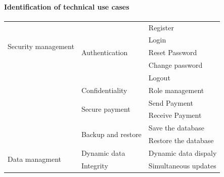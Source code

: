 \paragraph{Identification of technical use cases}

\begin{longtable}{|m{10em}|m{10em}|m{10em}|}\hline
      \multirow{4}{*}{Security management} & \multirow{5}{*}{Authentication}          & Register                                                    \\\cline{3-3}
                                           &                                          & Login                                                       \\\cline{3-3}
                                           &                                          & Reset Password                                              \\\cline{3-3}
                                           &                                          & Change password                                             \\\cline{3-3}
                                           &                                          & Logout                                                      \\\cline{2-3}
                                           & \multirow{1}{*}{Confidentiality}         & Role management                                             \\\cline{2-3}
                                           & \multirow{2}{*}{Secure payment}          & Send Payment                                                \\\cline{3-3}
                                           &                                          & Receive Payment                                             \\\cline{2-3}
                                           & \multirow{2}{*}{Backup and restore}      & Save the database                                           \\\cline{3-3}
                                           &                                          & Restore the database                                       \\\hline
      \multirow{7}{*}{Data managment}      & \multirow{1}{*}{Dynamic data}            & Dynamic data dispaly                                       \\\cline{2-3}
                                           & \multirow{1}{*}{Integrity}               & Simultaneous updates                                       \\\cline{2-3}

\end{longtable}
